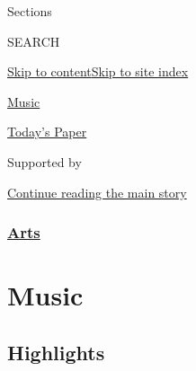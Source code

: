 Sections

SEARCH

\protect\hyperlink{site-content}{Skip to
content}\protect\hyperlink{site-index}{Skip to site index}

\href{https://www.nytimes.com/section/arts/music}{Music}

\href{https://myaccount.nytimes.com/auth/login?response_type=cookie\&client_id=vi}{}

\href{https://www.nytimes.com/section/todayspaper}{Today's Paper}

Supported by

\protect\hyperlink{after-sponsor}{Continue reading the main story}

\hypertarget{arts}{%
\subsubsection{\texorpdfstring{\href{/section/arts}{Arts}}{Arts}}\label{arts}}

\hypertarget{music}{%
\section{Music}\label{music}}

\hypertarget{highlights}{%
\subsection{Highlights}\label{highlights}}

